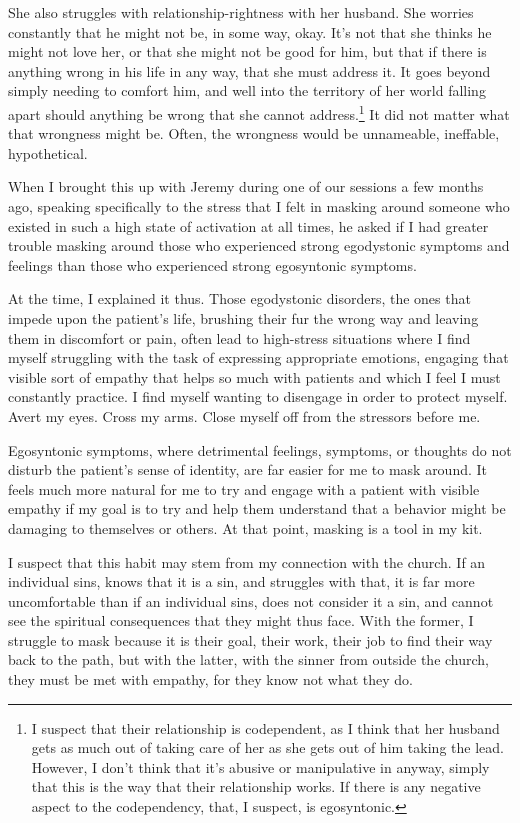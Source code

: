She also struggles with relationship-rightness with her husband. She worries constantly that he might not be, in some way, okay. It's not that she thinks he might not love her, or that she might not be good for him, but that if there is anything wrong in his life in any way, that she must address it. It goes beyond simply needing to comfort him, and well into the territory of her world falling apart should anything be wrong that she cannot address.\footnote{I suspect that their relationship is codependent, as I think that her husband gets as much out of taking care of her as she gets out of him taking the lead. However, I don't think that it's abusive or manipulative in anyway, simply that this is the way that their relationship works. If there is any negative aspect to the codependency, that, I suspect, is egosyntonic.} It did not matter what that wrongness might be. Often, the wrongness would be unnameable, ineffable, hypothetical.

When I brought this up with Jeremy during one of our sessions a few months ago, speaking specifically to the stress that I felt in masking around someone who existed in such a high state of activation at all times, he asked if I had greater trouble masking around those who experienced strong egodystonic symptoms and feelings than those who experienced strong egosyntonic symptoms.

At the time, I explained it thus. Those egodystonic disorders, the ones that impede upon the patient's life, brushing their fur the wrong way and leaving them in discomfort or pain, often lead to high-stress situations where I find myself struggling with the task of expressing appropriate emotions, engaging that visible sort of empathy that helps so much with patients and which I feel I must constantly practice. I find myself wanting to disengage in order to protect myself. Avert my eyes. Cross my arms. Close myself off from the stressors before me.

Egosyntonic symptoms, where detrimental feelings, symptoms, or thoughts do not disturb the patient's sense of identity, are far easier for me to mask around. It feels much more natural for me to try and engage with a patient with visible empathy if my goal is to try and help them understand that a behavior might be damaging to themselves or others. At that point, masking is a tool in my kit.

I suspect that this habit may stem from my connection with the church. If an individual sins, knows that it is a sin, and struggles with that, it is far more uncomfortable than if an individual sins, does not consider it a sin, and cannot see the spiritual consequences that they might thus face. With the former, I struggle to mask because it is their goal, their work, their job to find their way back to the path, but with the latter, with the sinner from outside the church, they must be met with empathy, for they know not what they do.

